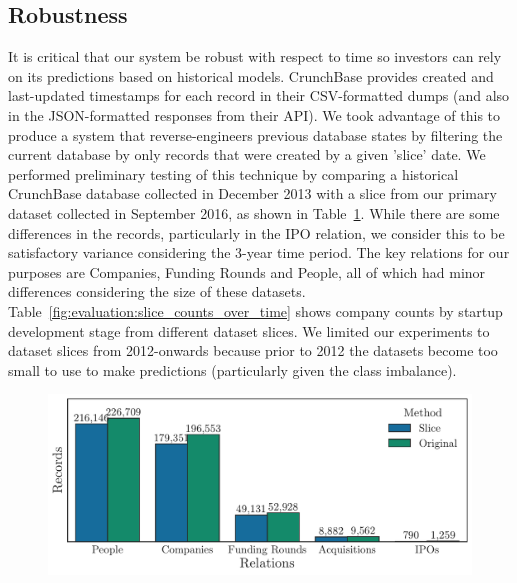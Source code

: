 \documentclass[../thesis/thesis.tex]{subfiles}
\begin{document}
\subsection{Robustness}

It is critical that our system be robust with respect to time so investors can rely on its predictions based on historical models. CrunchBase provides created and last-updated timestamps for each record in their CSV-formatted dumps (and also in the JSON-formatted responses from their API). We took advantage of this to produce a system that reverse-engineers previous database states by filtering the current database by only records that were created by a given 'slice' date. We performed preliminary testing of this technique by comparing a historical CrunchBase database collected in December 2013 with a slice from our primary dataset collected in September 2016, as shown in Table~\ref{fig:evaluation:2013_slice_comparison}. While there are some differences in the records, particularly in the IPO relation, we consider this to be satisfactory variance considering the 3-year time period. The key relations for our purposes are Companies, Funding Rounds and People, all of which had minor differences considering the size of these datasets. Table~\ref{fig:evaluation:slice_counts_over_time} shows company counts by startup development stage from different dataset slices. We limited our experiments to dataset slices from 2012-onwards because prior to 2012 the datasets become too small to use to make predictions (particularly given the class imbalance).

\begin{figure}[!htb]
    \centering
    \includegraphics[width=\textwidth]{../figures/evaluation/2013_slice_comparison}
    \caption[Dataset slice compared with original dataset]{}
    \label{fig:evaluation:2013_slice_comparison}
\end{figure}
\end{document}
